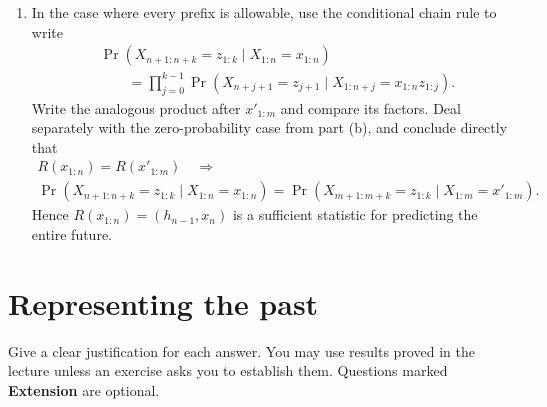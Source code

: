 \documentclass[11pt]{article}
\begin{document}
\begin{exercise}
\begin{enumerate}
    \item In the case where every prefix is allowable, use the conditional
      chain rule to write
      \[
        \begin{aligned}
        &\Pr\!\left(
          X_{n+1:n+k}=z_{1:k}\mid X_{1:n}=x_{1:n}
        \right)\\
        &\qquad=
        \prod_{j=0}^{k-1}
        \Pr\!\left(
          X_{n+j+1}=z_{j+1}
          \mid X_{1:n+j}=x_{1:n}z_{1:j}
        \right).
        \end{aligned}
      \]
      Write the analogous product after $x'_{1:m}$ and compare its factors.
      Deal separately with the zero-probability case from part (b), and
      conclude directly that
      \[
        \begin{gathered}
          R(x_{1:n})=R(x'_{1:m})
          \quad\Longrightarrow\\[1mm]
          \Pr\!\left(
            X_{n+1:n+k}=z_{1:k}\mid X_{1:n}=x_{1:n}
          \right)
          =
          \Pr\!\left(
            X_{m+1:m+k}=z_{1:k}\mid X_{1:m}=x'_{1:m}
          \right).
        \end{gathered}
      \]
      Hence $R(x_{1:n})=(h_{n-1},x_n)$ is a sufficient statistic for
      predicting the entire future.
  \end{enumerate}
\end{exercise}


\section{Representing the past}\label{sec:representing-the-past}

\begin{callout}[note][Instructions]
    Give a clear justification for each answer. You may use results proved in
    the lecture unless an exercise asks you to establish them. Questions marked
    \textbf{Extension} are optional.
\end{callout}
\end{document}
